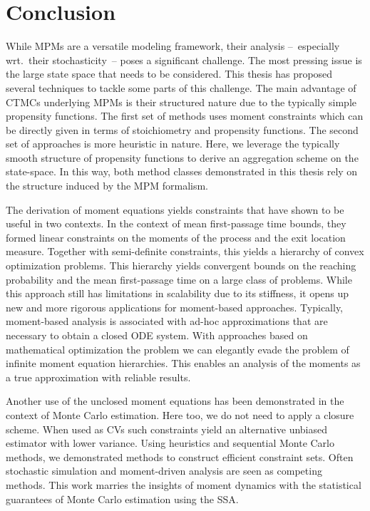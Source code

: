 \chapter{Conclusion}
While \aclp{MPM} are a versatile modeling framework, their analysis --~especially wrt.\ their stochasticity~-- poses a significant challenge.
The most pressing issue is the large state space that needs to be considered.
This thesis has proposed several techniques to tackle some parts of this challenge.
The main advantage of \acp{CTMC} underlying \acp{MPM} is their structured nature due to the typically simple propensity functions.
The first set of methods uses moment constraints which can be directly given in terms of stoichiometry and propensity functions.
The second set of approaches is more heuristic in nature.
Here, we leverage the typically smooth structure of propensity functions to derive an aggregation scheme on the state-space.
In this way, both method classes demonstrated in this thesis rely on the structure induced by the \ac{MPM} formalism.

The derivation of moment equations yields constraints that have shown to be useful in two contexts.
In the context of mean first-passage time bounds, they formed linear constraints on the moments of the process and the exit location measure.
Together with semi-definite constraints, this yields a hierarchy of convex optimization problems.
This hierarchy yields convergent bounds on the reaching probability and the mean first-passage time on a large class of problems.
While this approach still has limitations in scalability due to its stiffness, it opens up new and more rigorous applications for moment-based approaches.
Typically, moment-based analysis is associated with ad-hoc approximations that are necessary to obtain a closed \ac{ODE} system.
With approaches based on mathematical optimization the problem we can elegantly evade the problem of infinite moment equation hierarchies.
This enables an analysis of the moments as a true approximation with reliable results.

Another use of the unclosed moment equations has been demonstrated in the context of Monte Carlo estimation.
Here too, we do not need to apply a closure scheme.
When used as \aclp{CV} such constraints yield an alternative unbiased estimator with lower variance.
Using heuristics and sequential Monte Carlo methods, we demonstrated methods to construct efficient constraint sets.
Often stochastic simulation and moment-driven analysis are seen as competing methods.
This work marries the insights of moment dynamics with the statistical guarantees of Monte Carlo estimation using the \ac{SSA}.


